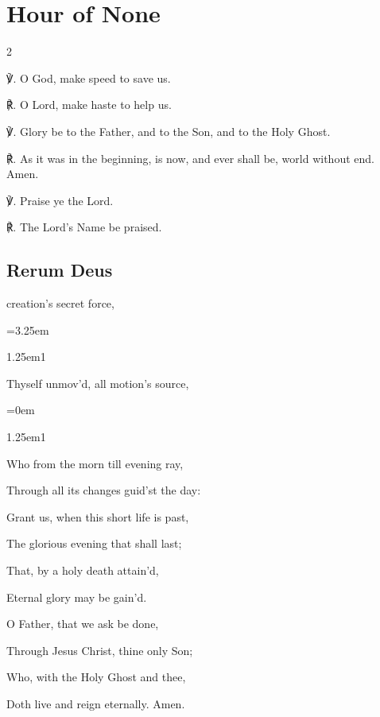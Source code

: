 \fancyhead[RE,LO]{}
\section{Hour of None}


\begin{multicols}{2}

℣. O God, {} make speed to save us.

℟. O Lord, make haste to help us.

℣. Glory be to the Father, and to the Son, and to the Holy Ghost.

℟. As it was in the beginning, is now, and ever shall be, world without end. Amen.

℣. Praise ye the Lord.

℟. The Lord's Name be praised.


\subsection{Rerum Deus}


 creation’s secret force,\par\noindent%
				\leftskip=3.25em
				\begin{hangparas}{1.25em}{1}\par\noindent
				Thyself unmov'd, all motion's source,\par
				\end{hangparas}
				\leftskip=0em
\par\noindent
\begin{hangparas}{1.25em}{1}\par\noindent
Who from the morn till evening ray,\par\noindent
Through all its changes guid'st the day:\\
\par\noindent
Grant us, when this short life is past,\par\noindent
The glorious evening that shall last;\par\noindent
That, by a holy death attain'd,\par\noindent
Eternal glory may be gain'd.\\
\par\noindent
O Father, that we ask be done,\par\noindent
Through Jesus Christ, thine only Son;\par\noindent
Who, with the Holy Ghost and thee,\par\noindent
Doth live and reign eternally. Amen.
\end{hangparas}


\end{multicols}
